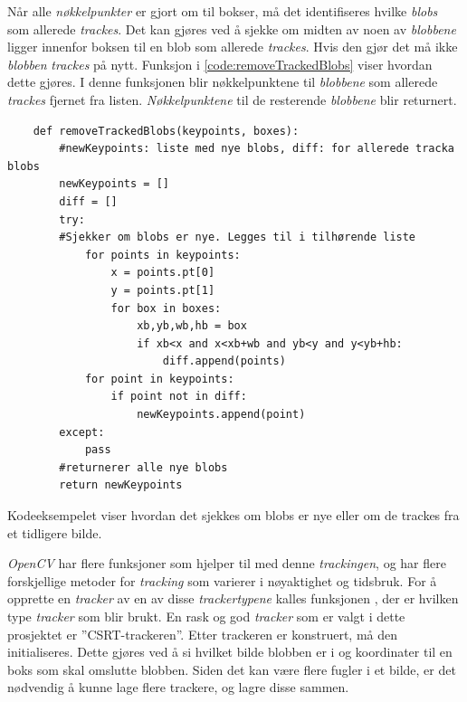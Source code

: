 Når alle \textit{nøkkelpunkter} er gjort om til bokser, må det identifiseres hvilke \textit{blobs} som allerede \textit{trackes}. 
Det kan gjøres ved å sjekke om midten av noen av \textit{blobbene} ligger innenfor boksen til en blob som allerede \textit{trackes}. 
Hvis den gjør det må ikke \textit{blobben} \textit{trackes} på nytt. 
Funksjon\newline {} i \autoref{code:removeTrackedBlobs} viser hvordan dette gjøres.
I denne funksjonen blir nøkkelpunktene til \textit{blobbene} som allerede \textit{trackes} fjernet fra listen. 
\textit{Nøkkelpunktene} til de resterende \textit{blobbene} blir returnert.

\begin{listing}[!htb]
\begin{verbatim}
    def removeTrackedBlobs(keypoints, boxes):
        #newKeypoints: liste med nye blobs, diff: for allerede tracka blobs
        newKeypoints = []
        diff = []
        try:
        #Sjekker om blobs er nye. Legges til i tilhørende liste
            for points in keypoints:
                x = points.pt[0]
                y = points.pt[1]
                for box in boxes:
                    xb,yb,wb,hb = box
                    if xb<x and x<xb+wb and yb<y and y<yb+hb:
                        diff.append(points)
            for point in keypoints:
                if point not in diff:
                    newKeypoints.append(point)
        except:
            pass
        #returnerer alle nye blobs
        return newKeypoints
\end{verbatim}
\caption{Kodeeksempelet viser hvordan det sjekkes om blobs er nye eller om de trackes fra et tidligere bilde.}
\label{code:removeTrackedBlobs}
\end{listing}

\textit{OpenCV} har flere funksjoner som hjelper til med denne \textit{trackingen}, og har flere forskjellige metoder for \textit{tracking} som varierer i nøyaktighet og tidsbruk.
For å opprette en \textit{tracker} av en av disse \textit{trackertypene} kalles funksjonen , der  er hvilken type \textit{tracker} som blir brukt. En rask og god \textit{tracker} som er valgt i dette prosjektet er ''CSRT-trackeren''. 
Etter trackeren er konstruert, må den initialiseres.
Dette gjøres ved å si hvilket bilde blobben er i og koordinater til en boks som skal omslutte blobben. 
Siden det kan være flere fugler i et bilde, er det nødvendig å kunne lage flere trackere, og lagre disse sammen.

